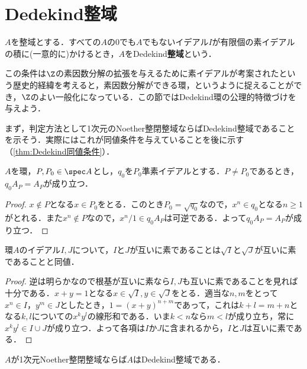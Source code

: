 \section{Dedekind整域}

\begin{defi}[Dedekind整域]
	$A$を整域とする．すべての$A$の0でも$A$でもないイデアル$I$が有限個の素イデアルの積に(一意的に)かけるとき，$A$をDedekind\textbf{整域}という．
\end{defi}

この条件は$\Z$の素因数分解の拡張を与えるために素イデアルが考案されたという歴史的経緯を考えると，素因数分解ができる環，というように捉えることができ，$\Z$のよい一般化になっている．この節ではDedekind環の公理的特徴づけを与えよう．

まず，判定方法として1次元のNoether整閉整域ならばDedekind整域であることを示そう．実際にはこれが同値条件を与えていることを後に示す（\ref{thm:Dedekind同値条件}）．

\begin{lem}\label{lem:Dedekind-1}
	$A$を環，$P,P_0\in\spec A$とし，$
	q_0$を$P_0$準素イデアルとする．$P\neq P_0$であるとき，$q_0A_P=A_P$が成り立つ．
\end{lem}

\begin{proof}
	$x\not\in P$となる$x\in P_0$をとる．このとき$P_0=\sqrt{q_0}$なので，$x^n\in q_0$となる$n\geq1$がとれる．また$x^n\not\in P$なので，$x^n/1\in q_0A_P$は可逆である．よって$q_0A_P=A_P$が成り立つ．
\end{proof}

\begin{lem}\label{lem:Dedekind-2}
	環$A$のイデアル$I,J$について，$I$と$J$が互いに素であることは$\sqrt{I}$と$\sqrt{J}$が互いに素であることと同値．
\end{lem}

\begin{proof}
	逆は明らかなので根基が互いに素なら$I,J$も互いに素であることを見れば十分である．$x+y=1$となる$x\in\sqrt{I},y\in\sqrt{J}$をとる．適当な$n,m$をとって$x^n\in I，y^m\in J$としたとき，$1=(x+y)^{n+m}$であって，これは$k+l=m+n$となる$k,l$についての$x^ky^l$の線形和である．いま$k<n$なら$m<l$が成り立ち，常に$x^ky^l\in I\cup J$が成り立つ．よって各項は$I$か$J$に含まれるから，$I$と$J$は互いに素である．
\end{proof}

\begin{thm}\label{thm:1dimNoether整閉整域ならDedekind}
	$A$が1次元Noether整閉整域ならば$A$はDedekind整域である．
\end{thm}

